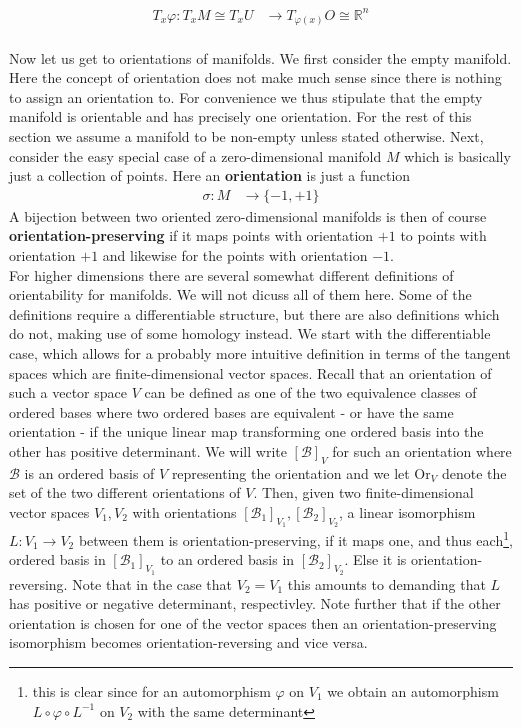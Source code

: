 \begin{align*}
  T_{x}\varphi
  \colon
  T_{x}M
  \cong
  T_{x}U
  &\to
  T_{\varphi(x)}O
  \cong
  \mathbb{R}^{n}
\end{align*}
\\
Now let us get to orientations of manifolds. We first consider the empty manifold. Here the concept of orientation does not make much sense since there is nothing to assign an orientation to. For convenience we thus stipulate that the empty manifold is orientable and has precisely one orientation. For the rest of this section we assume a manifold to be non-empty unless stated otherwise. Next, consider the easy special case of a zero-dimensional manifold $M$ which is basically just a collection of points. Here an \textbf{orientation} is just a function
\begin{align*}
  \sigma
  \colon
  M
  &\to
  \lbrace
    -1
    ,
    +1
  \rbrace
\end{align*}
A bijection between two oriented zero-dimensional manifolds is then of course \textbf{orientation-preserving} if it maps points with orientation $+1$ to points with orientation $+1$ and likewise for the points with orientation $-1$.
\\
For higher dimensions there are several somewhat different definitions of orientability for manifolds. We will not dicuss all of them here. Some of the definitions require a differentiable structure, but there are also definitions which do not, making use of some homology instead. We start with the differentiable case, which allows for a probably more intuitive definition in terms of the tangent spaces which are finite-dimensional vector spaces. Recall that an orientation of such a vector space $V$ can be defined as one of the two equivalence classes of ordered bases where two ordered bases are equivalent - or have the same orientation - if the unique linear map transforming one ordered basis into the other has positive determinant. We will write $[\mathcal{B}]_{V}$ for such an orientation where $\mathcal{B}$ is an ordered basis of $V$ representing the orientation and we let $\mathrm{Or}_{V}$ denote the set of the two different orientations of $V$. Then, given two finite-dimensional vector spaces $V_{1},V_{2}$ with orientations $[\mathcal{B}_{1}]_{V_{1}},[\mathcal{B}_{2}]_{V_{2}}$, a linear isomorphism $L \colon V_{1} \to V_{2}$ between them is orientation-preserving, if it maps one, and thus each\footnote{this is clear since for an automorphism $\varphi$ on $V_{1}$ we obtain an automorphism $L \circ \varphi \circ L^{-1}$ on $V_{2}$ with the same determinant}, ordered basis in $[\mathcal{B}_{1}]_{V_{1}}$ to an ordered basis in $[\mathcal{B}_{2}]_{V_{2}}$. Else it is orientation-reversing. Note that in the case that $V_{2} = V_{1}$ this amounts to demanding that $L$ has positive or negative determinant, respectivley. Note further that if the other orientation is chosen for one of the vector spaces then an orientation-preserving isomorphism becomes orientation-reversing and vice versa.
